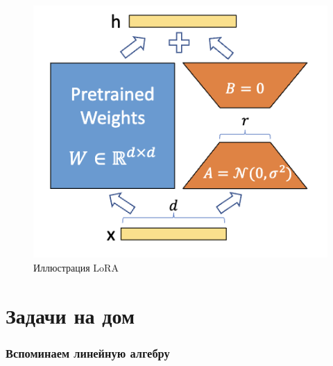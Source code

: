 \documentclass[
  russian,
  letterpaper,
  DIV=11,
  numbers=noendperiod]{scrartcl}
\begin{document}
\begin{figure}[H]

{\centering \includegraphics[width=1\linewidth,height=\textheight,keepaspectratio]{lora.png}

}

\caption{Иллюстрация LoRA}

\end{figure}%

\section{Задачи на
дом}\label{ux437ux430ux434ux430ux447ux438-ux43dux430-ux434ux43eux43c}

\subsubsection{Вспоминаем линейную
алгебру}\label{ux432ux441ux43fux43eux43cux438ux43dux430ux435ux43c-ux43bux438ux43dux435ux439ux43dux443ux44e-ux430ux43bux433ux435ux431ux440ux443-1}
\end{document}
